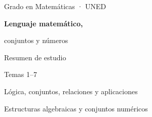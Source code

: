 \documentclass[11pt,a4paper,oneside]{book}
\begin{document}
\frontmatter
\hypersetup{pageanchor=false}
\begin{titlepage}
\centering
\vspace*{3cm}
{\Large Grado en Matemáticas · UNED\par}
\vspace{1.5cm}
{\Huge\bfseries Lenguaje matemático,\par conjuntos y números\par}
\vspace{1cm}
{\Large Resumen de estudio\par}
\vfill
{\large Temas 1--7\par}
\vspace{0.5cm}
{\large Lógica, conjuntos, relaciones y aplicaciones\par}
{\large Estructuras algebraicas y conjuntos numéricos\par}
\vspace{1cm}
\end{titlepage}
\hypersetup{pageanchor=true}
\tableofcontents
\mainmatter







\end{document}
